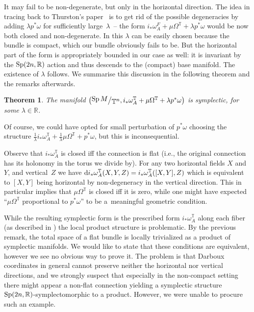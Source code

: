 \documentclass[10pt,a4paper]{amsart}
\numberwithin{equation}{section}
\newtheorem{Theorem}{Theorem}[section]
{ \theoremstyle{definition}
\newtheorem{Definition}[Theorem]{Definition}
\newtheorem{Example}[Theorem]{Example}
\newtheorem{Remark}[Theorem]{Remark} }
\newcommand{\bigslant}[2]{{\raisebox{.2em}{$#1$}\big/\raisebox{-.2em}{$#2$}}}
\begin{document}
It may fail to be non-degenerate, but only in the horizontal direction. The idea in \cite{fat} tracing back to Thurston's paper~\cite{thurston} is to get rid of the possible degeneracies by adding $\lambda p^*\omega$ for sufficiently large~$\lambda$~-- the form $i_*\omega^F_A + \mu\Omega^{\mathbb{T}} + \lambda p^*\omega$ would be now both closed and non-degenerate. In \cite{fat} this $\lambda$ can be easily chosen because the bundle is compact, which our bundle obviously fails to be. But the horizontal part of the form is appropriately bounded in our case as well: it is invariant by the ${\rm Sp}(2n,\mathbb{R})$ action and thus descends to the (compact) base manifold. The existence of $\lambda$ follows. We summarise this discussion in the following theorem and the remarks afterwards.
\begin{Theorem} \label{main2}
The manifold $\big(\bigslant{\operatorname{Sp} M}{\mathbb{T}^n},i_*\omega^{\mathbb{T}}_A + \mu\Omega^{\mathbb{T}} + \lambda p^*\omega\big)$ is symplectic, for some $\lambda\in\mathbb{R}$.
\end{Theorem}
Of course, we could have opted for small perturbation of $p^*\omega$ choosing the structure $\frac{1}{\lambda}i_*\omega^{\mathbb{T}}_A + \frac{1}{\lambda}\mu\Omega^{\mathbb{T}} + p^*\omega$, but this is inconsequential.
\begin{Remark}\label{dodac}
Observe that $i_*\omega^{\mathbb{T}}_A$ is closed iff the connection is flat (i.e., the original connection has its holonomy in the torus we divide by). For any two horizontal fields $X$ and $Y$, and vertical~$Z$ we have ${\rm d}i_*\omega^{\mathbb{T}}_A(X,Y,Z)=i_*\omega^{\mathbb{T}}_A([X,Y],Z)$ which is equivalent to $[X,Y]$ being horizontal by non-degeneracy in the vertical direction. This in particular implies that $\mu\Omega^{\mathbb{T}}$ is closed iff it is zero, while one might have expected ``$\mu\Omega^{\mathbb{T}}$ proportional to $p^*\omega$'' to be a~meaningful geometric condition.
\end{Remark}
\begin{Remark}\label{dodacdwa}
While the resulting symplectic form is the prescribed form $i_*\omega^{\mathbb{T}}_A$ along each fiber (as described in \cite{fat}) the local product structure is problematic. By the previous remark, the total space of a flat bundle is locally trivialized as a product of symplectic manifolds. We would like to state that these conditions are equivalent, however we see no obvious way to prove it. The problem is that Darboux coordinates in general cannot preserve neither the horizontal nor vertical directions, and we strongly suspect that especially in the non-compact setting there might appear a non-flat connection yielding a symplectic structure ${\rm Sp}(2n,\mathbb{R})$-symplectomorphic to a product. However, we were unable to procure such an example.
\end{Remark}
\end{document}
